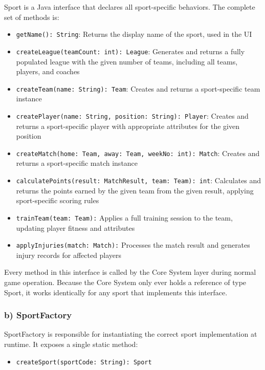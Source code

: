 \documentclass[12pt, a4paper]{article}
\begin{document}
Sport is a Java interface that declares all sport-specific behaviors. The complete set of
methods is:

\begin{itemize}
    \item \texttt{getName(): String}: Returns the display name of the sport, used in the UI
    \item \texttt{createLeague}\allowbreak\texttt{(teamCount:\,int):\,League}: Generates and returns a fully populated league with the given number of teams, including all teams, players, and coaches
    \item \texttt{createTeam}\allowbreak\texttt{(name:\,String):\,Team}: Creates and returns a sport-specific team instance
    \item \texttt{createPlayer}\allowbreak\texttt{(name:\,String, position:\,String):\,Player}: Creates and returns a sport-specific player with appropriate attributes for the given position
    \item \texttt{createMatch}\allowbreak\texttt{(home:\,Team, away:\,Team, weekNo:\,int):\,Match}: Creates and returns a sport-specific match instance
    \item \texttt{calculatePoints}\allowbreak\texttt{(result:\,MatchResult, team:\,Team):\,int}: Calculates and returns the points earned by the given team from the given result, applying sport-specific scoring rules
    \item \texttt{trainTeam}\allowbreak\texttt{(team:\,Team):} Applies a full training session to the team, updating player fitness and attributes
    \item \texttt{applyInjuries}\allowbreak\texttt{(match:\,Match):} Processes the match result and generates injury records for affected players
\end{itemize}

Every method in this interface is called by the Core System layer during normal game
operation. Because the Core System only ever holds a reference of type Sport, it works
identically for any sport that implements this interface.

\subsubsection*{b) SportFactory}

SportFactory is responsible for instantiating the correct sport implementation at
runtime. It exposes a single static method:

\begin{itemize}
    \item \texttt{createSport(sportCode: String): Sport}
\end{itemize}
\end{document}
